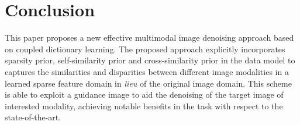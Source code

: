 \documentclass{article}
\begin{document}


\vspace{-0.2cm}

\section{Conclusion}
\label{sec:Conclusion}

\vspace{-0.2cm}

This paper proposes a new effective multimodal image denoising approach based on coupled dictionary learning. The proposed approach explicitly incorporates sparsity prior, self-similarity prior and cross-similarity prior in the data model to captures the similarities and disparities between different image modalities in a learned sparse feature domain in \emph{lieu} of the original image domain. This scheme is able to exploit a guidance image to aid the denoising of the target image of interested modality, achieving notable benefits in the task with respect to the state-of-the-art.


%
%




\clearpage
\pagebreak

%
%

\end{document}
